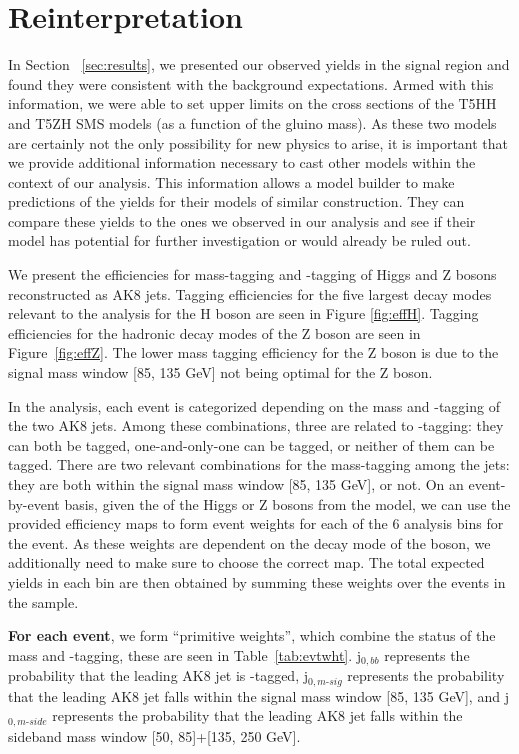 \chapter{Reinterpretation}
\label{chap:reinterpretation}

In Section ~\ref{sec:results}, we presented our observed yields in the signal region and found they were consistent with the background expectations. Armed with this information, we were able to set upper limits on the cross sections of the T5HH and T5ZH SMS models (as a function of the gluino mass). As these two models are certainly not the only possibility for new physics to arise, it is important that we provide additional information necessary to cast other models within the context of our analysis. This information allows a model builder to make predictions of the yields for their models of similar construction. They can compare these yields to the ones we observed in our analysis and see if their model has potential for further investigation or would already be ruled out.

We present the efficiencies for mass-tagging and \bbbar-tagging of Higgs and Z bosons reconstructed as AK8 jets. Tagging efficiencies for the five largest decay modes relevant to the analysis for the H boson are seen in Figure \ref{fig:effH}. Tagging efficiencies for the hadronic decay modes of the Z boson are seen in Figure~\ref{fig:effZ}. The lower mass tagging efficiency for the Z boson is due to the signal mass window [85, 135 GeV] not being optimal for the Z boson. 

In the analysis, each event is categorized depending on the mass and \bbbar-tagging of the two AK8 jets. Among these combinations, three are related to \bbbar-tagging: they can both be tagged, one-and-only-one can be tagged, or neither of them can be tagged. There are two relevant combinations for the mass-tagging among the jets: they are both within the signal mass window [85, 135 GeV], or not. On an event-by-event basis, given the \pt of the Higgs or Z bosons from the model, we can use the provided efficiency maps to form event weights for each of the 6 analysis bins for the event. As these weights are dependent on the decay mode of the boson, we additionally need to make sure to choose the correct map. The total expected yields in each bin are then obtained by summing these weights over the events in the sample.

\textbf{For each event}, we form ``primitive weights'', which combine the status of the mass and \bbbar-tagging, these are seen in Table~\ref{tab:evtwht}. j$_{0, bb}$ represents the probability that the leading AK8 jet is \bbbar-tagged, j$_{0, m\text{-}sig}$ represents the probability that the leading AK8 jet falls within the signal mass window [85, 135 GeV], and j$_{0, m\text{-}side}$ represents the probability that the leading AK8 jet falls within the sideband mass window [50, 85]+[135, 250 GeV].

